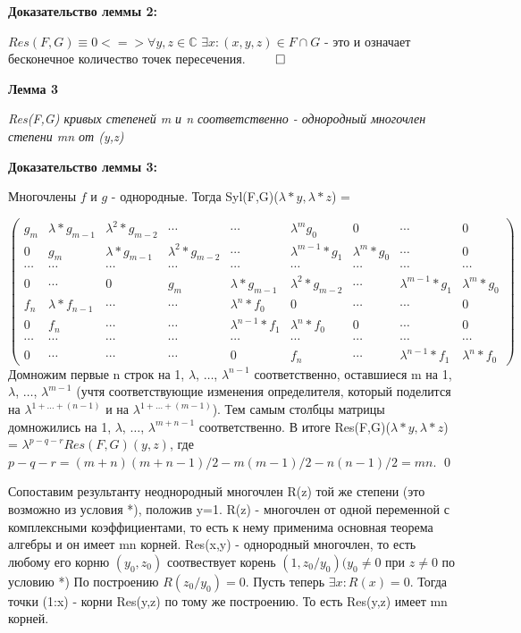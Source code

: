 \documentclass[a4paper, 12pt]{article}
\begin{document}
\textbf{Доказательство леммы 2:}

$Res(F,G) \equiv 0 <=> \forall y,z \in \mathbb{C}$ $\exists x: (x,y,z) \in F \cap G$ - это и означает бесконечное количество точек пересечения. $\qed$

\textbf{Лемма 3}

\textit{Res(F,G) кривых степеней m и n соответственно - однородный многочлен степени mn от (y,z)}

\textbf{Доказательство леммы 3:}

Многочлены $f$ и $g$ - однородные.
Тогда Syl(F,G)($\lambda*y,\lambda*z$) =

$\begin{pmatrix}
g_m & \lambda*g_{m-1} & \lambda^{2}*g_{m-2} & \cdots & \cdots & \lambda^{m}g_0 & 0 & \cdots & 0 \\
0 & g_m & \lambda*g_{m-1} & \lambda^{2}*g_{m-2} & \cdots & \lambda^{m-1}*g_1 & \lambda^{m}*g_0 & \cdots & 0 \\
\cdots & \cdots & \cdots & \cdots & \cdots & \cdots & \cdots & \cdots & \cdots \\
0 & \cdots & 0 & g_m & \lambda*g_{m-1} & \lambda^{2}*g_{m-2} & \cdots & \lambda^{m-1}*g_1 & \lambda^{m}*g_0 \\
f_n & \lambda*f_{n-1} & \cdots & \cdots & \lambda^{n}*f_0 & 0 & \cdots & \cdots & 0 \\
0 & f_n & \cdots & \cdots & \lambda^{n-1}*f_1 & \lambda^{n}*f_0 & 0 & \cdots & 0 \\
\cdots & \cdots & \cdots & \cdots & \cdots & \cdots & \cdots & \cdots & \cdots \\
0 & \cdots & \cdots & \cdots & 0 & f_n & \cdots & \lambda^{n-1}*f_1 & \lambda^{n}*f_0
\end{pmatrix}$
\smallskip
Домножим первые n строк на 1, $\lambda$, $\dots$, $\lambda^{n-1}$ соответственно, оставшиеся m на 1, $\lambda$, $\dots$, $\lambda^{m-1}$ (учтя соответствующие изменения определителя, который поделится на $\lambda^{1 +\dots + (n-1)}$ и на $\lambda^{1 +\dots + (m-1)}$).
Тем самым столбцы матрицы домножились на 1, $\lambda$, $\dots$, $\lambda^{m + n - 1}$ соответственно.\newline
В итоге Res(F,G)($\lambda*y,\lambda*z$) = $\lambda^{p-q-r}Res(F,G)(y,z)$, где $p - q - r = (m+n)(m+n-1)/2 - m(m-1)/2 - n(n-1)/2 = mn$.
\qed

\bigskip
Сопоставим результанту неоднородный многочлен R(z) той же степени (это возможно из условия *), положив y=1.
R(z) - многочлен от одной переменной с комплексными коэффициентами, то есть к нему применима основная теорема алгебры и он имеет mn корней.
Res(x,y) - однородный многочлен, то есть любому его корню $(y_0, z_0)$ соотвествует корень $(1, z_0/y_0) (y_0 \neq 0$ при $z \neq 0$ по условию *)
По построению $R(z_0/y_0) = 0$.
Пусть теперь $\exists x: R(x) = 0$. Тогда точки (1:x) - корни Res(y,z) по тому же построению.
То есть Res(y,z) имеет mn корней.
\end{document}
